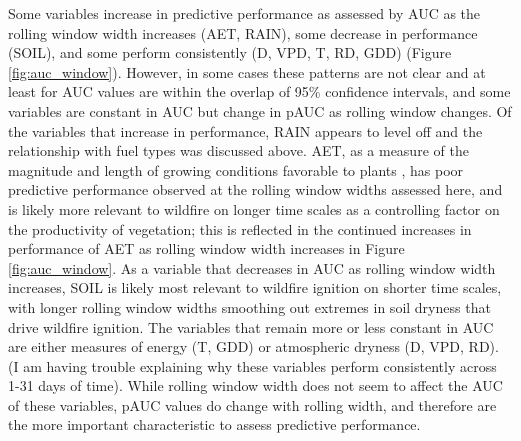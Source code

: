 \documentclass[11p]{article}
\begin{document}
Some variables increase in predictive performance as assessed by AUC as the rolling window width increases (AET, RAIN), some decrease in performance (SOIL), and some perform consistently (D, VPD, T, RD, GDD) (Figure \ref{fig:auc_window}). However, in some cases these patterns are not clear and at least for AUC values are within the overlap of 95\% confidence intervals, and some variables are constant in AUC but change in pAUC as rolling window changes. Of the variables that increase in performance, RAIN appears to level off and the relationship with fuel types was discussed above.  AET, as a measure of the magnitude and length of growing conditions favorable to plants \citep{stephensonActualEvapotranspirationDeficit1998}, has poor predictive performance observed at the rolling window widths assessed here, and is likely more relevant to wildfire on longer time scales as a controlling factor on the productivity of vegetation; this is reflected in the continued increases in performance of AET as rolling window width increases in Figure \ref{fig:auc_window}. As a variable that decreases in AUC as rolling window width increases, SOIL is likely most relevant to wildfire ignition on shorter time scales, with longer rolling window widths smoothing out extremes in soil dryness that drive wildfire ignition. The variables that remain more or less constant in AUC are either measures of energy (T, GDD) or atmospheric dryness (D, VPD, RD). (I am having trouble explaining why these variables perform consistently across 1-31 days of time). While rolling window width does not seem to affect the AUC of these variables, pAUC values do change with rolling width, and therefore are the more important characteristic to assess predictive performance.

\end{document}
